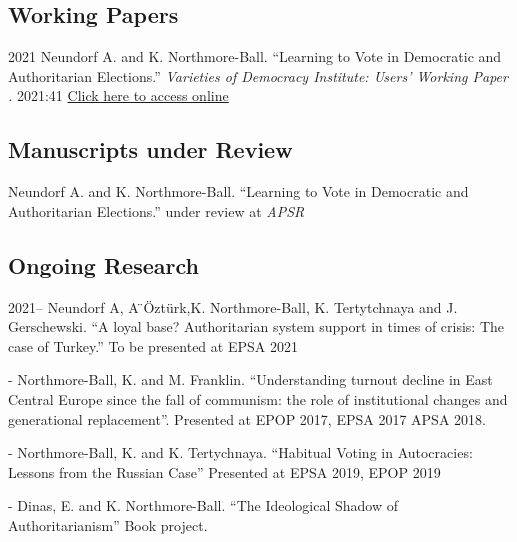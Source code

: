 \documentclass[12pt,letterpaper]{report}
\begin{document}
   \subsection*{Working Papers}

\begin{tablist}
	
	
	 \item[2021] \tab{}Neundorf A. and K. Northmore-Ball. \enquote{Learning to Vote in Democratic
		and Authoritarian Elections.} \textit{Varieties of Democracy Institute: Users' Working Paper .} 2021:41
	\href{https://www.v-dem.net/media/filer_public/c9/71/c97174ca-6e8b-4c6f-b91e-a3782a6ec829/uwp_41_final.pdf}{Click here to access online}
	
	
\end{tablist}

    \subsection*{Manuscripts under Review}

\begin{tablist}
	
	\item[\the\year] \tab{}Neundorf A. and K. Northmore-Ball. \enquote{Learning to Vote in Democratic
		and Authoritarian Elections.} under review at \textit{APSR} 
	
	
\end{tablist}


   \subsection*{Ongoing Research}

\begin{tablist}
	
	
	\item[2021--] \tab{}Neundorf A, A ̈\"{O}zt\"{u}rk,K. Northmore-Ball, K. Tertytchnaya and J. Gerschewski. \enquote{A loyal base? Authoritarian system support in times of crisis: The case of Turkey.} To be presented at EPSA 2021
	
	\item[-] \tab{}Northmore-Ball, K. and M. Franklin. \enquote{Understanding turnout decline in East Central Europe since the fall of communism:
	the role of institutional changes and generational replacement}. Presented at EPOP 2017, EPSA 2017 APSA 2018.
	
	\item[-] \tab{}Northmore-Ball, K. and K. Tertychnaya. \enquote{Habitual Voting in Autocracies: Lessons from the Russian Case} Presented at EPSA 2019, EPOP 2019
	
	\item[-] \tab{}Dinas, E. and K. Northmore-Ball. \enquote{The Ideological Shadow of Authoritarianism} Book project. 	
	
	
	
\end{tablist}
\end{document}
